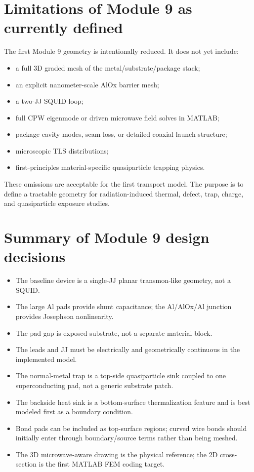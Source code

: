 \documentclass[11pt]{article}
\begin{document}
\section{Limitations of Module 9 as currently defined}
The first Module 9 geometry is intentionally reduced. It does not yet include:
\begin{itemize}[leftmargin=1.5em]
    \item a full 3D graded mesh of the metal/substrate/package stack;
    \item an explicit nanometer-scale AlOx barrier mesh;
    \item a two-JJ SQUID loop;
    \item full CPW eigenmode or driven microwave field solves in MATLAB;
    \item package cavity modes, seam loss, or detailed coaxial launch structure;
    \item microscopic TLS distributions;
    \item first-principles material-specific quasiparticle trapping physics.
\end{itemize}
These omissions are acceptable for the first transport model. The purpose is to define a tractable geometry for radiation-induced thermal, defect, trap, charge, and quasiparticle exposure studies.

\section{Summary of Module 9 design decisions}
\begin{physicsbox}
\begin{itemize}[leftmargin=1.5em]
    \item The baseline device is a single-JJ planar transmon-like geometry, not a SQUID.
    \item The large Al pads provide shunt capacitance; the Al/AlOx/Al junction provides Josephson nonlinearity.
    \item The pad gap is exposed substrate, not a separate material block.
    \item The leads and JJ must be electrically and geometrically continuous in the implemented model.
    \item The normal-metal trap is a top-side quasiparticle sink coupled to one superconducting pad, not a generic substrate patch.
    \item The backside heat sink is a bottom-surface thermalization feature and is best modeled first as a boundary condition.
    \item Bond pads can be included as top-surface regions; curved wire bonds should initially enter through boundary/source terms rather than being meshed.
    \item The 3D microwave-aware drawing is the physical reference; the 2D cross-section is the first MATLAB FEM coding target.
\end{itemize}
\end{physicsbox}
\end{document}
